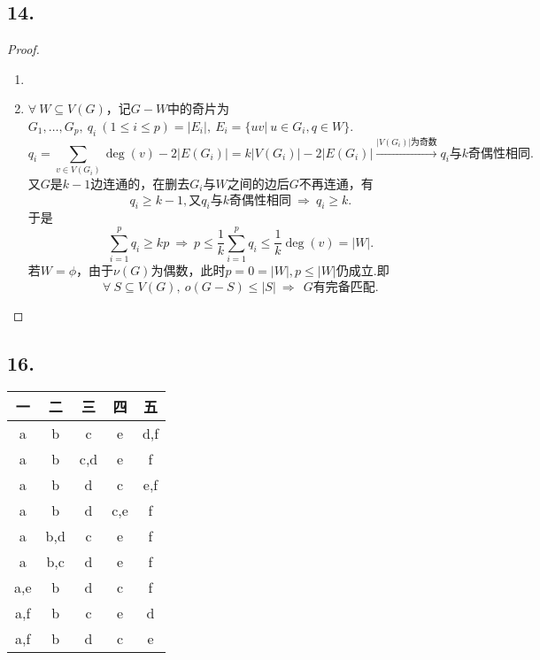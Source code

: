 \documentclass{article}
\begin{document}
\subsection*{14.}
\begin{proof}
    \begin{enumerate}
        \item []
        \item []$\forall\ W\subseteq V(G)$，记$G-W$中的奇片为$G_1,\ldots,G_p,\ q_i\ (1\leq i\leq p)=|E_i|,\ E_i=\{uv|\ u\in G_i,q\in W\}$.
        \[
            q_i =\sum\limits_{v\in V(G_i)} \deg(v) -2|E(G_i)|=k|V(G_i)|-2|E(G_i)|
            \xrightarrow{|V(G_i)|\mbox{为奇数}}
            q_i\mbox{与}k\mbox{奇偶性相同}.
        \]
        又$G$是$k-1$边连通的，在删去$G_i$与$W$之间的边后$G$不再连通，有
        \[
            q_i\geq k-1,\mbox{又}q_i \mbox{与} k\mbox{奇偶性相同}
            \ \Rightarrow\ 
            q_i\geq k.
        \]
        于是
        \[
            \sum\limits_{i=1}^{p} q_i \geq kp
            \ \Rightarrow\ 
            p\leq \displaystyle{\frac{1}{k}}\sum\limits_{i=1}^{p} q_i
            \leq \displaystyle{\frac{1}{k}}  \deg(v)= |W|.
        \]
        若$W=\phi$，由于$\nu(G)$为偶数，此时$p=0=|W|,p\leq |W|$仍成立.即
        \[
            \forall\ S\subseteq V(G),\ o(G-S)\leq |S|
            \ \Rightarrow\ \
            G\mbox{有完备匹配}.
        \]
    \end{enumerate}
\end{proof}
\subsection*{16.}
    \begin{table}[!ht]
        \centering
        \begin{tabular}{|c|c|c|c|c|}
        \hline
            一 & 二 & 三 & 四 & 五  \\ \hline
            a & b & c & e & d,f  \\ \hline
            a & b & c,d & e & f  \\ \hline
            a & b & d & c & e,f  \\ \hline
            a & b & d & c,e & f  \\ \hline
            a & b,d & c & e & f  \\ \hline
            a & b,c & d & e & f  \\ \hline
            a,e & b & d & c & f  \\ \hline
            a,f & b & c & e & d  \\ \hline
            a,f & b & d & c & e  \\ \hline
        \end{tabular}
    \end{table}
\end{document}

